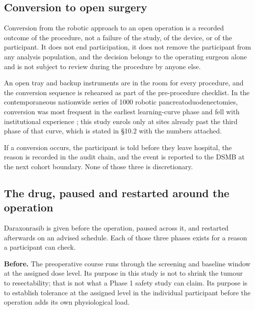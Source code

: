 \vspace{-0.7cm}

\subsection{Conversion to open surgery}

Conversion from the robotic approach to an open operation is a recorded outcome
of the procedure, not a failure of the study, of the device, or of the
participant. It does not end participation, it does not remove the participant
from any analysis population, and the decision belongs to the operating surgeon
alone and is not subject to review during the procedure by anyone else.

An open tray and backup instruments are in the room for every procedure, and the
conversion sequence is rehearsed as part of the pre-procedure checklist. In the
contemporaneous nationwide series of 1000 robotic pancreatoduodenectomies,
conversion was most frequent in the earliest learning-curve phase and fell with
institutional experience \cite{DutchCohort2025}; this study enrols only at sites
already past the third phase of that curve, which is stated in \S 10.2 with the
numbers attached.

If a conversion occurs, the participant is told before they leave hospital, the
reason is recorded in the audit chain, and the event is reported to the DSMB at
the next cohort boundary. None of those three is discretionary.

\subsection{The drug, paused and restarted around the operation}

Daraxonrasib is given before the operation, paused across it, and restarted
afterwards on an advised schedule. Each of those three phases exists for a
reason a participant can check.

\textbf{Before.} The preoperative course runs through the screening and baseline
window at the assigned dose level. Its purpose in this study is not to shrink
the tumour to resectability; that is not what a Phase 1 safety study can claim.
Its purpose is to establish tolerance at the assigned level in the individual
participant before the operation adds its own physiological load.

